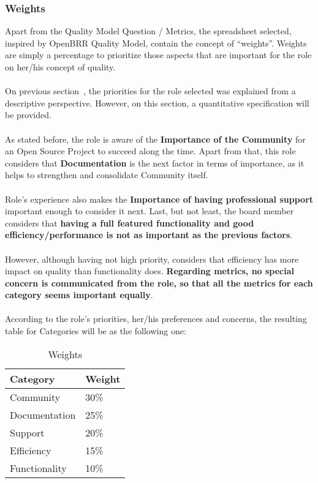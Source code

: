 \documentclass[11pt]{article}
\begin{document}
\subsubsection{Weights}\label{sec:weights}
Apart from the Quality Model Question / Metrics, the spreadsheet selected, inspired by OpenBRR Quality Model, contain the concept of ``weights''. Weights are simply a percentage to prioritize those aspects that are important for the role on her/his concept of quality. \\
\\
On previous section~, the priorities for the role selected was explained from a descriptive perspective. However, on this section, a quantitative specification will be provided.\\
\\
As stated before, the role is aware of the \textbf{Importance of the Community} for an Open Source Project to succeed along the time. Apart from that, this role considers that \textbf{Documentation} is the next factor in terms of importance, as it helps to strengthen and consolidate Community itself.\\
\\
Role's experience also makes the \textbf{Importance of having professional support} important enough to consider it next. Last, but not least, the board member considers that \textbf{having a full featured functionality and good efficiency/performance is not as important as the previous factors}.\\
\\
However, although having not high priority, considers that efficiency has more impact on quality than functionality does. \textbf{Regarding metrics, no special concern is communicated from the role, so that all the metrics for each category seems important equally}.\\
\\
According to the role's priorities, her/his preferences and concerns, the resulting table for Categories will be as the following one:
\begin{table}[H]
  \begin{center}
    \begin{tabular}{ | l | l | }
    \toprule
    \textbf{Category} & \textbf{Weight} \\
    \hline
    Community & 30\%\\
    Documentation & 25\% \\
    Support & 20\% \\
    Efficiency & 15\% \\
    Functionality & 10\% \\
    \bottomrule
    \end{tabular}
    \caption{Weights}
    \label{tab:weights}
  \end{center}
\end{table}
\end{document}
